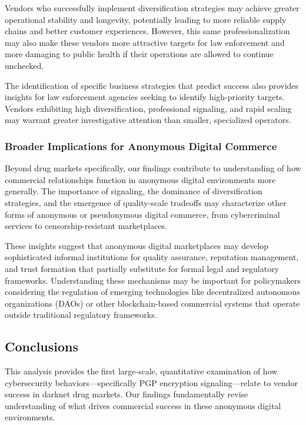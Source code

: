 \documentclass{article}
\begin{document}
Vendors who successfully implement diversification strategies may achieve greater operational stability and longevity, potentially leading to more reliable supply chains and better customer experiences. However, this same professionalization may also make these vendors more attractive targets for law enforcement and more damaging to public health if their operations are allowed to continue unchecked.

The identification of specific business strategies that predict success also provides insights for law enforcement agencies seeking to identify high-priority targets. Vendors exhibiting high diversification, professional signaling, and rapid scaling may warrant greater investigative attention than smaller, specialized operators.

\subsubsection{Broader Implications for Anonymous Digital Commerce}

Beyond drug markets specifically, our findings contribute to understanding of how commercial relationships function in anonymous digital environments more generally. The importance of signaling, the dominance of diversification strategies, and the emergence of quality-scale tradeoffs may characterize other forms of anonymous or pseudonymous digital commerce, from cybercriminal services to censorship-resistant marketplaces.

These insights suggest that anonymous digital marketplaces may develop sophisticated informal institutions for quality assurance, reputation management, and trust formation that partially substitute for formal legal and regulatory frameworks. Understanding these mechanisms may be important for policymakers considering the regulation of emerging technologies like decentralized autonomous organizations (DAOs) or other blockchain-based commercial systems that operate outside traditional regulatory frameworks.

\subsection{Conclusions}

This analysis provides the first large-scale, quantitative examination of how cybersecurity behaviors—specifically PGP encryption signaling—relate to vendor success in darknet drug markets. Our findings fundamentally revise understanding of what drives commercial success in these anonymous digital environments.
\end{document}
